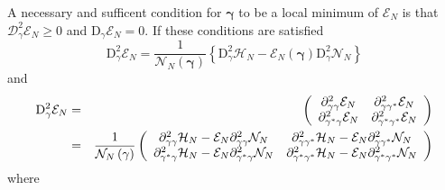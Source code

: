 \documentclass[aps,preprint]{revtex4}
\begin{document}
A necessary and sufficent condition for $\mathbf{\gamma }$ to be a local
minimum of $\mathcal{E}_{N}$ is that $\mathcal{D}_{\gamma }^{2}\mathcal{E}%
_{N}\geq 0$ and $\mathrm{D}_{\gamma }\mathcal{E}_{N}=0$. If these conditions
are satisfied 
\begin{equation}
\mathrm{D}_{\gamma }^{2}\mathcal{E}_{N}=\frac{1}{\mathcal{N}_{N}\left( 
\mathbf{\gamma }\right) }\left\{ \mathrm{D}_{\gamma }^{2}\mathcal{H}_{N}-%
\mathcal{E}_{N}\left( \mathbf{\gamma }\right) \mathrm{D}_{\gamma }^{2}%
\mathcal{N}_{N}\right\} 
\end{equation}%
and%
\begin{eqnarray}
\mathrm{D}_{\gamma }^{2}\mathcal{E}_{N} &=&\left( 
\begin{array}{cc}
\mathrm{\partial }_{\gamma \gamma }^{2}\mathcal{E}_{N} & \mathrm{\partial }%
_{\gamma \gamma ^{\ast }}^{2}\mathcal{E}_{N} \\ 
\mathrm{\partial }_{\gamma ^{\ast }\gamma }^{2}\mathcal{E}_{N} & \mathrm{%
\partial }_{\gamma ^{\ast }\gamma ^{\ast }}^{2}\mathcal{E}_{N}%
\end{array}%
\right)  \\
&=&\frac{1}{\mathcal{N}_{N}\left( \mathbf{\gamma }\right) }\left( 
\begin{array}{cc}
\mathrm{\partial }_{\gamma \gamma }^{2}\mathcal{H}_{N}-\mathcal{E}_{N}%
\mathrm{\partial }_{\gamma \gamma }^{2}\mathcal{N}_{N} & \mathrm{\partial }%
_{\gamma \gamma ^{\ast }}^{2}\mathcal{H}_{N}-\mathcal{E}_{N}\mathrm{\partial 
}_{\gamma \gamma ^{\ast }}^{2}\mathcal{N}_{N} \\ 
\mathrm{\partial }_{\gamma ^{\ast }\gamma }^{2}\mathcal{H}_{N}-\mathcal{E}%
_{N}\mathrm{\partial }_{\gamma ^{\ast }\gamma }^{2}\mathcal{N}_{N} & \mathrm{%
\partial }_{\gamma ^{\ast }\gamma ^{\ast }}^{2}\mathcal{H}_{N}-\mathcal{E}%
_{N}\mathrm{\partial }_{\gamma ^{\ast }\gamma ^{\ast }}^{2}\mathcal{N}_{N}%
\end{array}%
\right) 
\end{eqnarray}%
where 
\end{document}
